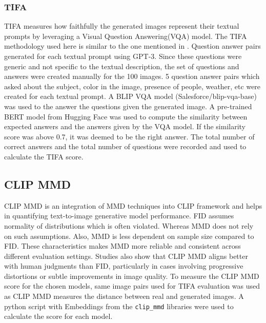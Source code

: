 \documentclass{article}
\begin{document}
\subsubsection{TIFA}
TIFA measures how faithfully the generated images represent their textual prompts 
by leveraging a Visual Question Answering(VQA) model. The TIFA methodology used here is similar to the one mentioned in \cite{Yushi2023}. Question answer pairs generated for each 
textual prompt using GPT-3. Since these questions were generic and not specific to the textual description, 
the set of questions and answers were created manually for the 100 images. 5 question answer pairs which asked about 
the subject, color in the image, presence of people, weather, etc were created for each textual prompt. A BLIP VQA model 
(Salesforce/blip-vqa-base) was used to the answer the questions given the generated image. A pre-trained BERT model from Hugging Face 
was used to compute the similarity between expected answers and the answers 
given by the VQA model. If the similarity score was above 0.7, it was deemed to be the right answer. 
The total number of correct answers and the total number of questions were recorded and used to calculate the 
TIFA score.

\subsection{CLIP MMD}
CLIP MMD is an integration of MMD techniques into CLIP framework and helps in quantifying text-to-image generative model performance. FID assumes normality of distributions which is often violated. Whereas MMD does not rely on such assumptions. Also, MMD is less dependent on sample size compared to FID. These characteristics makes MMD more reliable and consistent across different evaluation settings. Studies also show that CLIP MMD aligns better with human judgments than FID, particularly in cases involving progressive distortions or subtle improvements in image quality. To measure the CLIP MMD score for the chosen models, same image pairs used for TIFA evaluation was used as CLIP MMD measures the distance between real and generated images. A python script with Embeddings from the \verb|clip_mmd| libraries were used to calculate the score for each model.   
\end{document}

